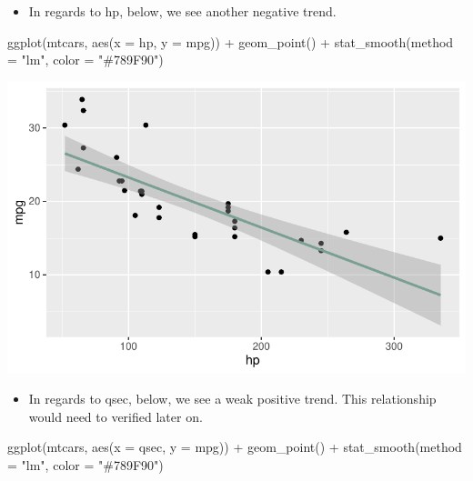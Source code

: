 \documentclass[
  letterpaper,
  DIV=11,
  numbers=noendperiod]{scrreprt}
\newenvironment{Shaded}{\begin{snugshade}}{\end{snugshade}}
\newcommand{\AttributeTok}[1]{\textcolor[rgb]{0.40,0.45,0.13}{#1}}
\newcommand{\FunctionTok}[1]{\textcolor[rgb]{0.28,0.35,0.67}{#1}}
\newcommand{\NormalTok}[1]{\textcolor[rgb]{0.00,0.23,0.31}{#1}}
\newcommand{\SpecialCharTok}[1]{\textcolor[rgb]{0.37,0.37,0.37}{#1}}
\newcommand{\StringTok}[1]{\textcolor[rgb]{0.13,0.47,0.30}{#1}}
\providecommand{\tightlist}{%
  \setlength{\itemsep}{0pt}\setlength{\parskip}{0pt}}\usepackage{longtable,booktabs,array}
\begin{document}
\begin{itemize}
\tightlist
\item
  In regards to hp, below, we see another negative trend.
\end{itemize}

\begin{Shaded}
\begin{Highlighting}[]
\FunctionTok{ggplot}\NormalTok{(mtcars, }\FunctionTok{aes}\NormalTok{(}\AttributeTok{x =}\NormalTok{ hp, }\AttributeTok{y =}\NormalTok{ mpg)) }\SpecialCharTok{+} \FunctionTok{geom\_point}\NormalTok{() }\SpecialCharTok{+} \FunctionTok{stat\_smooth}\NormalTok{(}\AttributeTok{method =} \StringTok{"lm"}\NormalTok{,}
    \AttributeTok{color =} \StringTok{"\#789F90"}\NormalTok{)}
\end{Highlighting}
\end{Shaded}

\includegraphics{dataviz_files/figure-pdf/unnamed-chunk-52-1.pdf}

\begin{itemize}
\tightlist
\item
  In regards to qsec, below, we see a weak positive trend. This
  relationship would need to verified later on.
\end{itemize}

\begin{Shaded}
\begin{Highlighting}[]
\FunctionTok{ggplot}\NormalTok{(mtcars, }\FunctionTok{aes}\NormalTok{(}\AttributeTok{x =}\NormalTok{ qsec, }\AttributeTok{y =}\NormalTok{ mpg)) }\SpecialCharTok{+} \FunctionTok{geom\_point}\NormalTok{() }\SpecialCharTok{+} \FunctionTok{stat\_smooth}\NormalTok{(}\AttributeTok{method =} \StringTok{"lm"}\NormalTok{,}
    \AttributeTok{color =} \StringTok{"\#789F90"}\NormalTok{)}
\end{Highlighting}
\end{Shaded}
\end{document}

